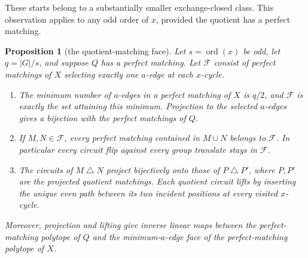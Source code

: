 \documentclass[11pt,a4paper]{article}
\newtheorem{proposition}[theorem]{Proposition}
\theoremstyle{definition}
\theoremstyle{remark}
\newcommand{\ord}{\operatorname{ord}}
\begin{document}
These starts belong to a substantially smaller exchange-closed class.  This observation applies to any odd order of $x$, provided the quotient has a perfect matching.
\begin{proposition}[the quotient-matching face]\label{prop:quotient-matching-face}
Let $s=\ord(x)$ be odd, let $q=|G|/s$, and suppose $Q$ has a perfect matching.  Let $\mathcal F$ consist of perfect matchings of $X$ selecting exactly one $a$-edge at each $x$-cycle.
\begin{enumerate}[label=\textup{(\roman*)}]
\item The minimum number of $a$-edges in a perfect matching of $X$ is $q/2$, and $\mathcal F$ is exactly the set attaining this minimum.  Projection to the selected $a$-edges gives a bijection with the perfect matchings of $Q$.
\item If $M,N\in\mathcal F$, every perfect matching contained in $M\cup N$ belongs to $\mathcal F$.  In particular every circuit flip against every group translate stays in $\mathcal F$.
\item The circuits of $M\mathbin\triangle N$ project bijectively onto those of $P\mathbin\triangle P'$, where $P,P'$ are the projected quotient matchings.  Each quotient circuit lifts by inserting the unique even path between its two incident positions at every visited $x$-cycle.
\end{enumerate}
Moreover, projection and lifting give inverse linear maps between the perfect-matching polytope of $Q$ and the minimum-$a$-edge face of the perfect-matching polytope of $X$.
\end{proposition}
\end{document}
